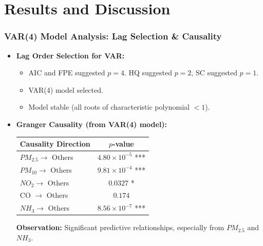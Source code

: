 \documentclass[svgnames, 12pt]{beamer}
\begin{document}
\section{Results and Discussion}
\begin{frame}
    \frametitle{VAR(4) Model Analysis: Lag Selection \& Causality}
    \begin{itemize}
        \item \textbf{Lag Order Selection for VAR:}
            \begin{itemize}
                \item AIC and FPE suggested $p=4$. HQ suggested $p=2$, SC suggested $p=1$.
                \item VAR(4) model selected.
                \item Model stable (all roots of characteristic polynomial $<1$).
            \end{itemize}
        \item \textbf{Granger Causality (from VAR(4) model):}
            \begin{center}
            \footnotesize
            \begin{tabular}{lc}
                \toprule
                Causality Direction & $p$-value \\
                \midrule
                $PM_{2.5} \rightarrow$ Others & $4.80 \times 10^{-5}$ *** \\
                $PM_{10} \rightarrow$ Others & $9.81 \times 10^{-4}$ *** \\
                $NO_{2} \rightarrow$ Others & $0.0327$ * \\
                CO $\rightarrow$ Others & $0.174$ \\
                $NH_{3} \rightarrow$ Others & $8.56 \times 10^{-7}$ *** \\
                \bottomrule
            \end{tabular}
            \end{center}
            \vspace{0.2cm}
            \textbf{Observation:} Significant predictive relationships, especially from $PM_{2.5}$ and $NH_3$.
    \end{itemize}
\end{frame}
\end{document}
